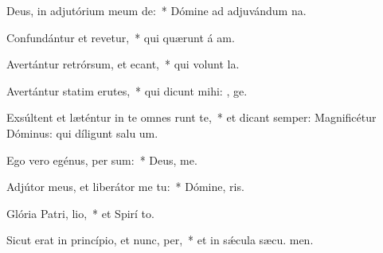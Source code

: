 \item Deus, in adjutórium meum de:~* Dómine ad adjuvándum  na.
\item Confundántur et revetur,~* qui quærunt á am.
\item Avertántur retrórsum, et ecant,~* qui volunt  la.
\item Avertántur statim erutes,~* qui dicunt mihi: , ge.
\item Exsúltent et læténtur in te omnes  runt te,~* et dicant semper: Magnificétur Dóminus: qui díligunt salu um.
\item Ego vero egénus,  per sum:~* Deus,  me.
\item Adjútor meus, et liberátor me  tu:~* Dómine,  ris.
\item Glória Patri,  lio,~* et Spirí to.
\item Sicut erat in princípio, et nunc,  per,~* et in sǽcula sæcu. men.

